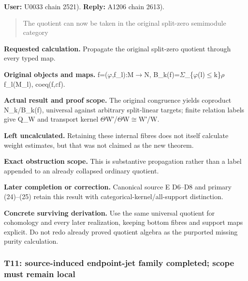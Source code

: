 \documentclass[10pt,a4paper,oneside]{report}
\begin{document}
\textbf{User:} U0033
\protect{} chain 2521).
\textbf{Reply:} A1206
\protect{} chain 2613).

\begin{quote}
The quotient can now be taken in the original split-zero semimodule
category
\end{quote}

\textbf{Requested calculation.} Propagate the original split-zero
quotient through every typed map.

\textbf{Original objects and maps.}
f=(\allowbreak{}\ensuremath{φ}\allowbreak{},f\_l):M\allowbreak{}\ensuremath{→}\allowbreak{}N,
B\_k(f)=\allowbreak{}\ensuremath{Σ}\allowbreak{}\_\{\allowbreak{}\ensuremath{φ}\allowbreak{}(l)\allowbreak{}\ensuremath{≤}\allowbreak{}k\}\allowbreak{}\ensuremath{ρ}\allowbreak{}
f\_l(M\_l), coeq(f,\allowbreak{}\ensuremath{ε}\allowbreak{}f).

\textbf{Actual result and proof scope.} The original congruence yields
coproduct N\_k/B\_k(f), universal against arbitrary split-linear
targets; finite relation labels give Q\_W and transport kernel
\allowbreak{}\ensuremath{Θ}\allowbreak{}W′/\allowbreak{}\ensuremath{Θ}\allowbreak{}W\allowbreak{}\ensuremath{≅}\allowbreak{}W′/W.

\textbf{Left uncalculated.} Retaining these internal fibres does not
itself calculate weight estimates, but that was not claimed as the new
theorem.

\textbf{Exact obstruction scope.} This is substantive propagation rather
than a label appended to an already collapsed ordinary quotient.

\textbf{Later completion or correction.} Canonical source E D6--D8 and
primary (24)--(25) retain this result with
categorical-kernel/all-support distinction.

\textbf{Concrete surviving derivation.} Use the same universal quotient
for cohomology and every later realization, keeping bottom fibres and
support maps explicit. Do not redo already proved quotient algebra as
the purported missing purity calculation.

\subsubsection{T11: source-induced endpoint-jet family completed; scope
must remain
local}\label{t11-source-induced-endpoint-jet-family-completed-scope-must-remain-local}
\end{document}
